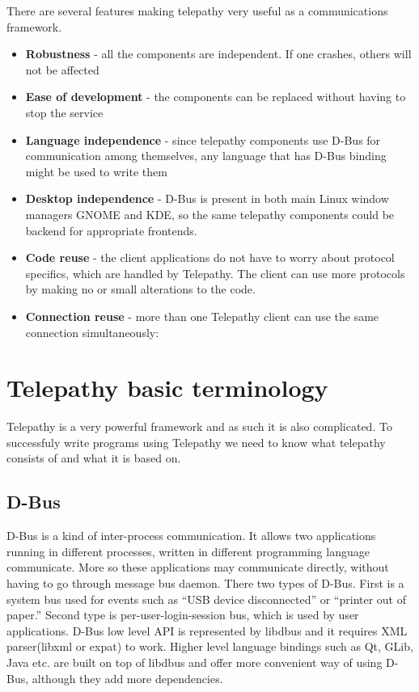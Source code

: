There are several features making telepathy very useful as a communications framework.

\begin{itemize}

	\item {\bf Robustness} - all the components are independent. If one crashes, others will not be affected

	\item {\bf Ease of development} - the components can be replaced without having to stop the service 

	\item {\bf Language independence} - since telepathy components use D-Bus for communication among themselves, any language that has D-Bus binding might be used to write them

	\item {\bf Desktop independence} - D-Bus is present in both main Linux window managers GNOME and KDE, so the same telepathy components could be backend for appropriate frontends.

	\item {\bf Code reuse} - the client applications do not have to worry about protocol specifics, which are handled by Telepathy. The client can use more protocols by making no or small alterations to the code.

	\item {\bf Connection reuse} - more than one Telepathy client can use the same connection simultaneously:
\end{itemize}

\section{Telepathy basic terminology}
Telepathy is a very powerful framework and as such it is also complicated. To successfuly write programs using Telepathy we need to know what telepathy consists of and what it is based on. 

\subsection*{D-Bus}
D-Bus is a kind of inter-process communication. It allows two applications running in different processes, written in different programming language communicate. More so these applications may communicate directly, without having to go through message bus daemon. There two types of D-Bus. First is a system bus used for events such as ``USB device disconnected'' or ``printer out of paper.'' Second type is per-user-login-session bus, which is used by user applications. D-Bus low level API is represented by libdbus and it requires XML parser(libxml or expat) to work. Higher level language bindings such as Qt, GLib, Java etc. are built on top of libdbus and offer more convenient way of using D-Bus, although they add more dependencies.\cite{dbus}\cite{dbusTP} 

